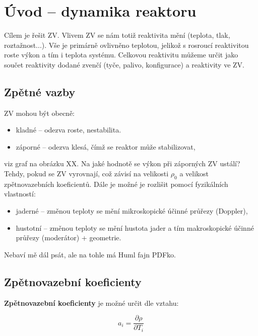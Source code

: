 \section{Úvod -- dynamika reaktoru}

Cílem je řešit ZV. Vlivem ZV se nám totiž reaktivita mění (teplota, tlak, roztažnost...). Vše je primárně ovlivněno teplotou, jelikož s rosroucí reaktivitou roste výkon a tím i teplota systému. Celkovou reaktivitu můžeme určit jako součet reaktivity dodané zvenčí (tyče, palivo, konfigurace) a reaktivity ve ZV.\\

\subsection{Zpětné vazby}

ZV mohou být obecně:

\begin{itemize}
  \item kladné -- odezva roste, nestabilita.
  \item záporné -- odezva klesá, čímž se reaktor může stabilizovat,
\end{itemize}

viz graf na obrázku XX. Na jaké hodnotě se výkon při záporných ZV ustálí? Tehdy, pokud se ZV vyrovnají, což závisí na velikosti $\rho_0$ a velikost zpětnovazebních koeficientů. Dále je možné je rozlišit pomocí fyzikálních vlastností:

\begin{itemize}
  \item jaderné -- změnou teploty se mění mikroskopické účinné průřezy (Doppler),
  \item hustotní -- změnou teploty se mění hustota jader a tím makroskopické účinné průřezy (moderátor) + geometrie.
\end{itemize}

Nebaví mě dál psát, ale na tohle má Huml fajn PDFko.

\subsection{Zpětnovazební koeficienty}

\textbf{Zpětnovazební koeficienty} je možné určit dle vztahu:

\begin{equation}
  \boxed{
  a_i = \dfrac{\partial \rho}{\partial T_i}
  \label{zpetnovazebni_koeficient_definice}
  }
\end{equation}

